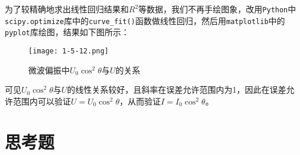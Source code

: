 \documentclass[12pt]{article}
\begin{document}
为了较精确地求出线性回归结果和$R^2$等数据，我们不再手绘图象，改用\verb|Python|中\verb|scipy.optimize|库中的\verb|curve_fit()|函数做线性回归，然后用\verb|matplotlib|中的\verb|pyplot|库绘图，结果如下图所示：

\begin{figure}[htbp]
    \centering
    \texttt{[image: 1-5-12.png]}
    \caption{微波偏振中$U_0\cos^2\theta$与$U$的关系}
\end{figure}

可见$U_0\cos^2\theta$与$U$的线性关系较好，且斜率在误差允许范围内为1，因此在误差允许范围内可以验证$U=U_0\cos^2\theta$，从而验证$I=I_0\cos^2\theta$。

\section{思考题}
\end{document}
